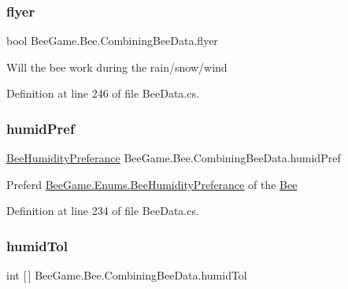 \subsubsection{\texorpdfstring{flyer}{flyer}}
{\footnotesize\ttfamily bool Bee\+Game.\+Bee.\+Combining\+Bee\+Data.\+flyer}



Will the bee work during the rain/snow/wind 



Definition at line 246 of file Bee\+Data.\+cs.

\mbox{\label{struct_bee_game_1_1_bee_1_1_combining_bee_data_ab9a9a9623d942632f8007711b65f909e}} 
\subsubsection{\texorpdfstring{humid\+Pref}{humidPref}}
{\footnotesize\ttfamily \hyperlink{namespace_bee_game_1_1_enums_a66566cbc9da8d1d1e402156b4bd3bf9d}{Bee\+Humidity\+Preferance} Bee\+Game.\+Bee.\+Combining\+Bee\+Data.\+humid\+Pref}



Preferd \hyperlink{namespace_bee_game_1_1_enums_a66566cbc9da8d1d1e402156b4bd3bf9d}{Bee\+Game.\+Enums.\+Bee\+Humidity\+Preferance} of the \hyperlink{namespace_bee_game_1_1_bee}{Bee} 



Definition at line 234 of file Bee\+Data.\+cs.

\mbox{\label{struct_bee_game_1_1_bee_1_1_combining_bee_data_a98c56c89bcd5f983b4d022c113f789e3}} 
\subsubsection{\texorpdfstring{humid\+Tol}{humidTol}}
{\footnotesize\ttfamily int \mbox{[}$\,$\mbox{]} Bee\+Game.\+Bee.\+Combining\+Bee\+Data.\+humid\+Tol}



